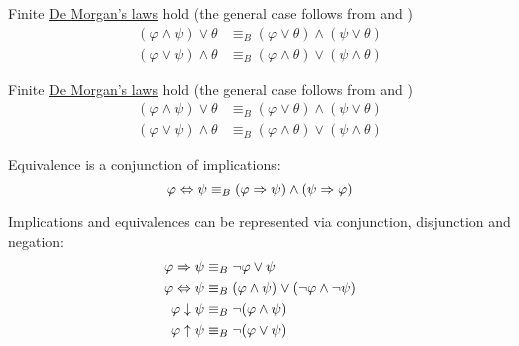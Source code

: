 \begin{proposition}
\begin{PropEnum}
     Finite \hyperref[thm:de_morgans_laws]{De Morgan's laws} hold (the general case follows from  and )
    \begin{align}
      (\varphi \wedge \psi) \vee \theta &\equiv_B (\varphi \vee \theta) \wedge (\psi \vee \theta)   \label{eq:def:boolean_equivalences/de_morgan/and_over_or} \\
      (\varphi \vee \psi) \wedge \theta &\equiv_B (\varphi \wedge \theta) \vee (\psi \wedge \theta) \label{eq:def:boolean_equivalences/de_morgan/or_over_and}
    \end{align}

     Finite \hyperref[thm:de_morgans_laws]{De Morgan's laws} hold (the general case follows from  and )
    \begin{align}
      (\varphi \wedge \psi) \vee \theta &\equiv_B (\varphi \vee \theta) \wedge (\psi \vee \theta)   \label{eq:def:boolean_equivalences/de_morgan/and_over_or} \\
      (\varphi \vee \psi) \wedge \theta &\equiv_B (\varphi \wedge \theta) \vee (\psi \wedge \theta) \label{eq:def:boolean_equivalences/de_morgan/or_over_and}
    \end{align}

     Equivalence is a conjunction of implications:
    \begin{equation}\label{eq:def:boolean_equivalences/equivalence_via_implication/axiom}
      \varphi \Leftrightarrow \psi \equiv_B (\varphi \Rightarrow \psi) \wedge (\psi \Rightarrow \varphi)
    \end{equation}

     Implications and equivalences can be represented via conjunction, disjunction and negation:
    \begin{align}
      \varphi \Rightarrow \psi   &\equiv_B \neg \varphi \vee \psi                                     \label{eq:def:boolean_equivalences/connectives_via_and_or/implies} \\
      \varphi \Leftrightarrow \psi       &\equiv_B (\varphi \wedge \psi) \vee (\neg \varphi \wedge \neg \psi) \label{eq:def:boolean_equivalences/connectives_via_and_or/iff} \\
      \varphi \downarrow \psi &\equiv_B \neg (\varphi \wedge \psi)                                 \label{eq:def:boolean_equivalences/connectives_via_and_or/pierces_arrow} \\
      \varphi \uparrow \psi   &\equiv_B \neg (\varphi \vee \psi)                                   \label{eq:def:boolean_equivalences/connectives_via_and_or/sheffers_stroke}
    \end{align}


\end{PropEnum}
\end{proposition}
